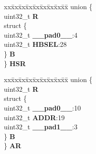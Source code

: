 \begin{DoxyCompactItemize}
\begin{tabbing}
\end{tabbing}\item 
\mbox{\label{structFLASH__tag_a44e271eb9c68170225bf1ed77c13937c}} 
\begin{tabbing}
xx\=xx\=xx\=xx\=xx\=xx\=xx\=xx\=xx\=\kill
union \{\\
\>uint32\_t {\bfseries R}\\
\>struct \{\\
\>\>uint32\_t {\bfseries \_\_pad0\_\_}:4\\
\>\>uint32\_t {\bfseries HBSEL}:28\\
\>\} {\bfseries B}\\
\} {\bfseries HSR}\\

\end{tabbing}\item 
\mbox{\label{structFLASH__tag_acac6c6b61eba2292bafa2d1ecfdec23a}} 
\begin{tabbing}
xx\=xx\=xx\=xx\=xx\=xx\=xx\=xx\=xx\=\kill
union \{\\
\>uint32\_t {\bfseries R}\\
\>struct \{\\
\>\>uint32\_t {\bfseries \_\_pad0\_\_}:10\\
\>\>uint32\_t {\bfseries ADDR}:19\\
\>\>uint32\_t {\bfseries \_\_pad1\_\_}:3\\
\>\} {\bfseries B}\\
\} {\bfseries AR}\\


\end{tabbing}
\end{DoxyCompactItemize}

